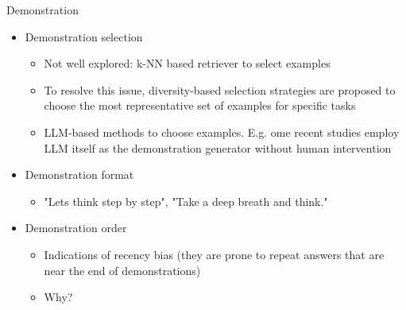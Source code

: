 \documentclass[10pt]{beamer}
\begin{document}
\begin{frame}{Demonstration}

\begin{itemize}
\item  Demonstration selection
\begin{itemize}
\item Not well explored: k-NN based retriever to select examples
\item To resolve this issue, diversity-based selection strategies are proposed to choose the most representative set of examples for specific tasks
\item LLM-based methods to choose examples. E.g. ome recent studies employ LLM itself as the demonstration generator without human intervention
\end{itemize}
\item Demonstration format
\begin{itemize}
\item "Lets think step by step", "Take a deep breath and think."
\end{itemize}
\item Demonstration order
\begin{itemize}
\item Indications of recency bias (they are prone to repeat answers that are near the end of demonstrations)
\item Why?
\end{itemize}

\end{itemize}


\end{frame}
\end{document}
